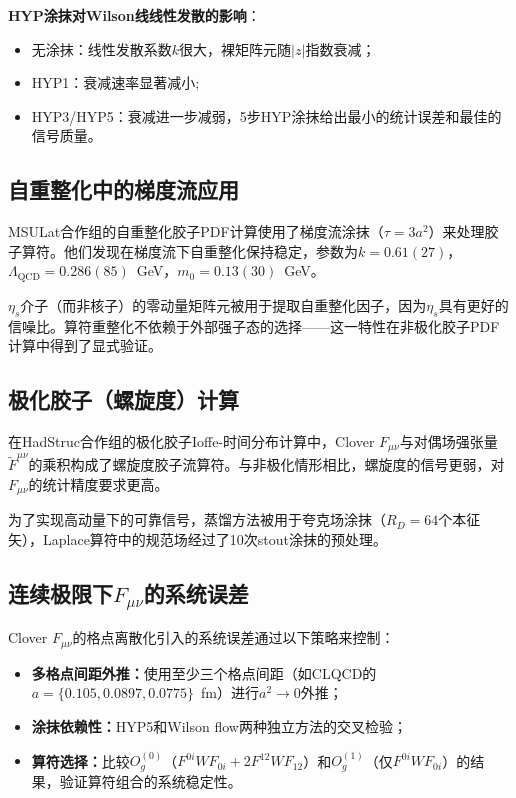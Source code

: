 \documentclass[12pt,a4paper]{ctexart}
\theoremstyle{definition}
\begin{document}
\textbf{HYP涂抹对Wilson线线性发散的影响}\cite{Fan2018gluon,Chen2025gluon}：
\begin{itemize}
    \item 无涂抹：线性发散系数$k$很大，裸矩阵元随$|z|$指数衰减；
    \item HYP1：衰减速率显著减小;
    \item HYP3/HYP5：衰减进一步减弱，5步HYP涂抹给出最小的统计误差和最佳的信号质量。
\end{itemize}

\subsection{自重整化中的梯度流应用}

MSULat合作组的自重整化胶子PDF计算\cite{NieMiera2025}使用了梯度流涂抹（$\tau = 3a^2$）来处理胶子算符。他们发现在梯度流下自重整化保持稳定，参数为$k = 0.61(27)$，$\Lambda_{\text{QCD}} = 0.286(85)$~GeV，$m_0 = 0.13(30)$~GeV。

$\eta_s$介子（而非核子）的零动量矩阵元被用于提取自重整化因子，因为$\eta_s$具有更好的信噪比。算符重整化不依赖于外部强子态的选择——这一特性在非极化胶子PDF计算中得到了显式验证\cite{NieMiera2025}。

\subsection{极化胶子（螺旋度）计算}

在HadStruc合作组的极化胶子Ioffe-时间分布计算中\cite{Egerer2022}，Clover $F_{\mu\nu}$与对偶场强张量$\tilde{F}^{\mu\nu}$的乘积构成了螺旋度胶子流算符。与非极化情形相比，螺旋度的信号更弱，对$F_{\mu\nu}$的统计精度要求更高。

为了实现高动量下的可靠信号，蒸馏方法被用于夸克场涂抹（$R_D = 64$个本征矢），Laplace算符中的规范场经过了10次stout涂抹的预处理\cite{Egerer2022}。

\subsection{连续极限下$F_{\mu\nu}$的系统误差}

Clover $F_{\mu\nu}$的格点离散化引入的系统误差通过以下策略来控制：

\begin{itemize}
    \item \textbf{多格点间距外推：}使用至少三个格点间距（如CLQCD的$a = \{0.105, 0.0897, 0.0775\}$~fm）进行$a^2 \to 0$外推\cite{Chen2025gluon}；
    \item \textbf{涂抹依赖性：}HYP5和Wilson flow两种独立方法的交叉检验\cite{NoteGluonPDFs}；
    \item \textbf{算符选择：}比较$O^{(0)}_g$（$F^{0i}WF_{0i} + 2F^{12}WF_{12}$）和$O^{(1)}_g$（仅$F^{0i}WF_{0i}$）的结果，验证算符组合的系统稳定性\cite{NoteGluonPDFs}。
\end{itemize}
\end{document}
